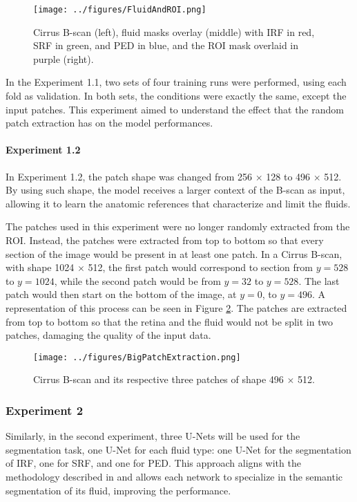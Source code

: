 \begin{figure}[!ht]
	\centering
	\texttt{[image: ../figures/FluidAndROI.png]}
	\caption{Cirrus B-scan (left), fluid masks overlay (middle) with IRF in red, SRF in green, and PED in blue, and the ROI mask overlaid in purple (right).}
	\label{fig:FluidAndROI}
\end{figure}

\par
In the Experiment 1.1, two sets of four training runs were performed, using each fold as validation. In both sets, the conditions were exactly the same, except the input patches. This experiment aimed to understand the effect that the random patch extraction has on the model performances.

\paragraph{Experiment 1.2}
In Experiment 1.2, the patch shape was changed from 256 $\times$ 128 to 496 $\times$ 512. By using such shape, the model receives a larger context of the B-scan as input, allowing it to learn the anatomic references that characterize and limit the fluids.
\par
The patches used in this experiment were no longer randomly extracted from the ROI. Instead, the patches were extracted from top to bottom so that every section of the image would be present in at least one patch. In a Cirrus B-scan, with shape 1024 $\times$ 512, the first patch would correspond to section from $y=528$ to $y=1024$, while the second patch would be from $y=32$ to $y=528$. The last patch would then start on the bottom of the image, at $y=0$, to $y=496$. A representation of this process can be seen in Figure \ref{fig:BigPatchExtraction}. The patches are extracted from top to bottom so that the retina and the fluid would not be split in two patches, damaging the quality of the input data.

\begin{figure}[!ht]
	\centering
	\texttt{[image: ../figures/BigPatchExtraction.png]}
	\caption{Cirrus B-scan and its respective three patches of shape 496 $\times$ 512.}
	\label{fig:BigPatchExtraction}
\end{figure}

\subsubsection{Experiment 2}\label{Experiment2}
Similarly, in the second experiment, three U-Nets will be used for the segmentation task, one U-Net for each fluid type: one U-Net for the segmentation of IRF, one for SRF, and one for PED. This approach aligns with the methodology described in \textcite{Rahil2023, Padilla2022} and allows each network to specialize in the semantic segmentation of its fluid, improving the performance.

